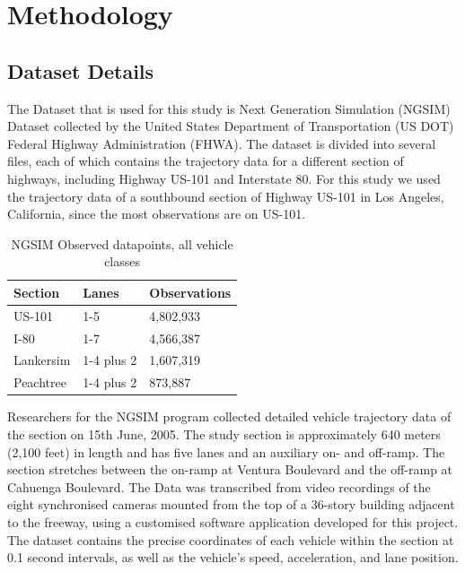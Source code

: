 \documentclass[11pt]{uonthesis}
\begin{document}
\chapter{Methodology}
\section{Dataset Details}

The Dataset that is used for this study is Next Generation Simulation (NGSIM) Dataset \cite{ngsim} collected by the United States Department of Transportation (US DOT) Federal Highway Administration (FHWA). The dataset is divided into several files, each of which contains the trajectory data for a different section of highways, including Highway US-101 and Interstate 80. For this study we used the trajectory data of a southbound section of Highway US-101 in Los Angeles, California, since the most observations are on US-101.

\begin{table}[ht!]
    \centering
    \begin{tabular}{ |p{3cm}|p{3cm}|p{3cm}| }
        \hline
        Section & Lanes & Observations\\
        \hline
        US-101 & 1-5 & 4,802,933\\
        I-80 & 1-7 & 4,566,387\\ 
        Lankersim & 1-4 plus 2 & 1,607,319\\
        Peachtree & 1-4 plus 2 & 873,887\\
        \hline
    \end{tabular}
\caption{NGSIM Observed datapoints, all vehicle classes}
\label{table:ngsim}
\end{table}

Researchers for the NGSIM program collected detailed vehicle trajectory data of the section on 15th June, 2005. The study section is approximately 640 meters (2,100 feet) in length and has five lanes and an auxiliary on- and off-ramp. The section stretches between the on-ramp at Ventura Boulevard and the off-ramp at Cahuenga Boulevard. The Data was transcribed from video recordings of the eight synchronised cameras mounted from the top of a 36-story building adjacent to the freeway, using a customised software application developed for this project. The dataset contains the precise coordinates of each vehicle within the section at 0.1 second intervals, as well as the vehicle's speed, acceleration, and lane position.
\end{document}
